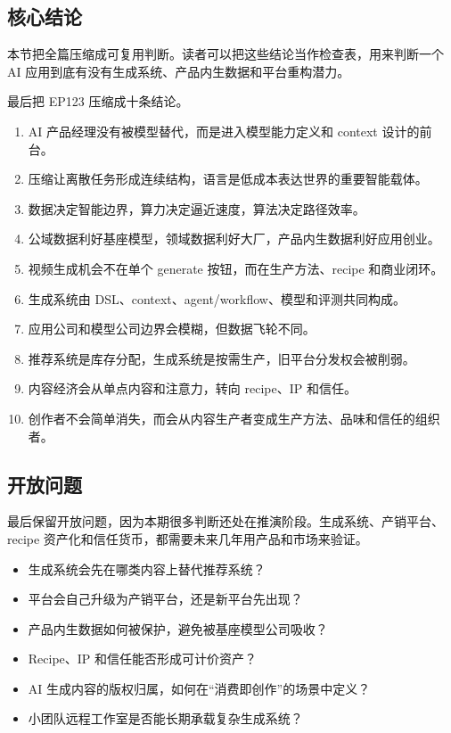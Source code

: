 \documentclass[a4paper]{article}
\begin{document}
\subsection{核心结论}

本节把全篇压缩成可复用判断。读者可以把这些结论当作检查表，用来判断一个 AI 应用到底有没有生成系统、产品内生数据和平台重构潜力。

最后把 EP123 压缩成十条结论。

\begin{enumerate}
\item AI 产品经理没有被模型替代，而是进入模型能力定义和 context 设计的前台。
\item 压缩让离散任务形成连续结构，语言是低成本表达世界的重要智能载体。
\item 数据决定智能边界，算力决定逼近速度，算法决定路径效率。
\item 公域数据利好基座模型，领域数据利好大厂，产品内生数据利好应用创业。
\item 视频生成机会不在单个 generate 按钮，而在生产方法、recipe 和商业闭环。
\item 生成系统由 DSL、context、agent/workflow、模型和评测共同构成。
\item 应用公司和模型公司边界会模糊，但数据飞轮不同。
\item 推荐系统是库存分配，生成系统是按需生产，旧平台分发权会被削弱。
\item 内容经济会从单点内容和注意力，转向 recipe、IP 和信任。
\item 创作者不会简单消失，而会从内容生产者变成生产方法、品味和信任的组织者。
\end{enumerate}

\subsection{开放问题}

最后保留开放问题，因为本期很多判断还处在推演阶段。生成系统、产销平台、recipe 资产化和信任货币，都需要未来几年用产品和市场来验证。

\begin{itemize}
\item 生成系统会先在哪类内容上替代推荐系统？
\item 平台会自己升级为产销平台，还是新平台先出现？
\item 产品内生数据如何被保护，避免被基座模型公司吸收？
\item Recipe、IP 和信任能否形成可计价资产？
\item AI 生成内容的版权归属，如何在“消费即创作”的场景中定义？
\item 小团队远程工作室是否能长期承载复杂生成系统？
\end{itemize}
\end{document}
